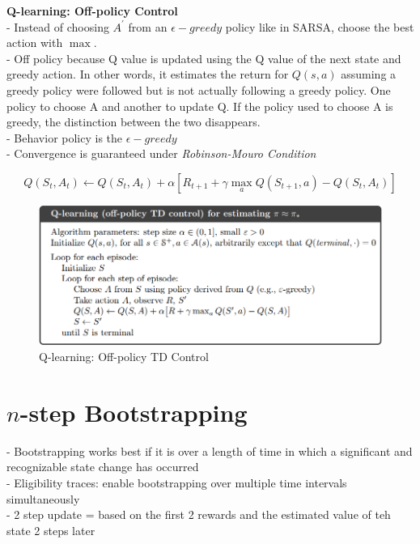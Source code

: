 \documentclass{article}
\begin{document}
\noindent
\textbf{Q-learning: Off-policy Control}\\
- Instead of choosing $A^{\prime}$ from an $\epsilon-greedy$ policy like in
SARSA, choose the best action with $\max$. \\
- Off policy because Q value is updated using the Q value of the next state and
greedy action. In other words, it estimates the return for $Q(s,a)$ assuming a
greedy policy were followed but is not actually following a greedy policy. One
policy to choose A and another to update Q. If the policy used to choose A is
greedy, the distinction between the two disappears.\\
- Behavior policy is the $\epsilon-greedy$\\
- Convergence is guaranteed under \textit{Robinson-Mouro Condition}

\begin{equation}
Q\left(S_{t}, A_{t}\right) \leftarrow Q\left(S_{t}, A_{t}\right)+\alpha\left[R_{t+1}+\gamma \max _{a} Q\left(S_{t+1}, a\right)-Q\left(S_{t}, A_{t}\right)\right]
\end{equation}

\begin{figure}[h]
\includegraphics[scale=0.4]{offpolicy_qlearning}
\centering
\caption{Q-learning: Off-policy TD Control}
\end{figure}

\newpage
\noindent
\section{$n$-step Bootstrapping}
- Bootstrapping works best if it is over a length of time in which a significant
and recognizable state change has occurred \\
- Eligibility traces: enable bootstrapping over multiple time intervals
simultaneously \\
- 2 step update = based on the first 2 rewards and the estimated value of teh
state 2 steps later\\
\end{document}
